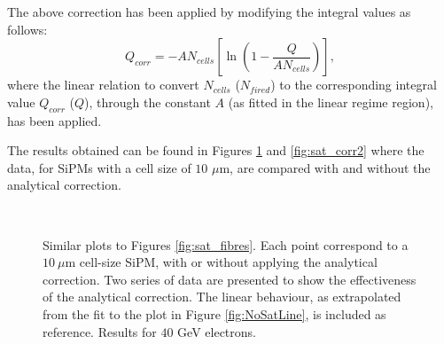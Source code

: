 The above correction has been applied by modifying the integral values as follows:
\begin{equation}
	Q_{corr} = - A N_{cells} \left[ \ln\left(1 - \frac{Q}{A N_{cells}}\right) \right],
\end{equation}
where the linear relation to convert $N_{cells}$ ($N_{fired}$) to the corresponding integral value $Q_{corr}$ ($Q$), through the constant $A$ (as fitted in the linear regime region), has been applied.

The results obtained can be found in Figures \ref{fig:sat_corr1} and \ref{fig:sat_corr2} where the data, for SiPMs with a cell size of $10$ $\mu$m, are compared with and without the analytical correction.

\begin{figure}
	\centering
	\quad
	\\
	\caption{Similar plots to Figures \ref{fig:sat_fibres}. Each point correspond to a $10~\mu$m cell-size SiPM, with or without applying the analytical correction. Two series of data are presented to show the effectiveness of the analytical correction. The linear behaviour, as extrapolated from the fit to the plot in Figure \ref{fig:NoSatLine}, is included as reference. Results for $40$ GeV electrons.}
	\label{fig:sat_corr1}
\end{figure}

